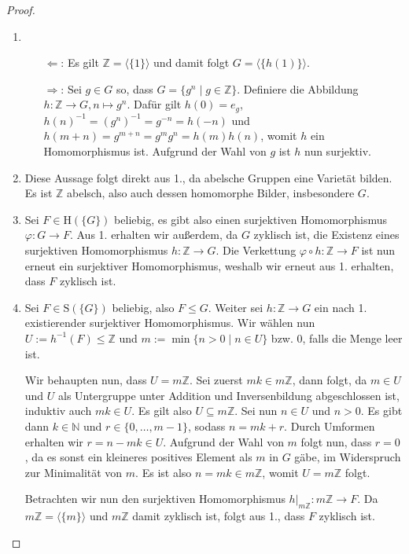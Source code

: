 \begin{proof} {\ }
    \begin{enumerate}
        \item \begin{itemize}
            \item[$\Leftarrow$:] Es gilt $\mathbb{Z}=\langle \{1\} \rangle$ und damit folgt $G=\langle \{h(1)\} \rangle$.
            \item[$\Rightarrow$:] Sei $g \in G$ so, dass $G = \{g^n \mid g \in \mathbb{Z}\} $. Definiere die Abbildung $h: \mathbb{Z} \to G, n \mapsto g^n$. Dafür gilt $h(0) = e_g$, $h(n)^{-1} = (g^{n})^{-1} = g^{-n} = h(-n)$ und $h(m+n) = g^{m+n} = g^m g^n = h(m)h(n)$, womit $h$ ein Homomorphismus ist. Aufgrund der Wahl von $g$ ist $h$ nun surjektiv.
        \end{itemize}
        \item Diese Aussage folgt direkt aus 1., da abelsche Gruppen eine Varietät bilden. Es ist $\mathbb{Z}$ abelsch, also auch dessen homomorphe Bilder, insbesondere $G$.
        \item Sei $F \in \mathrm{H}(\{G\})$ beliebig, es gibt also einen surjektiven Homomorphismus $\varphi: G \to F$. Aus 1. erhalten wir außerdem, da $G$ zyklisch ist, die Existenz eines surjektiven Homomorphismus $h: \mathbb{Z} \to G$. Die Verkettung $\varphi \circ h: \mathbb{Z} \to F$ ist nun erneut ein surjektiver Homomorphismus, weshalb wir erneut aus 1. erhalten, dass $F$ zyklisch ist.
        \item Sei $F \in \mathrm{S}(\{G\})$ beliebig, also $F \le G$. Weiter sei $h: \mathbb{Z} \to G$ ein nach 1. existierender surjektiver Homomorphismus.
        Wir wählen nun $U := h^{-1}(F) \le \mathbb{Z}$ und $m := \min\{n > 0 \mid n \in U\}$ bzw. $0$, falls die Menge leer ist. 
        
        Wir behaupten nun, dass $U = m \mathbb{Z}$. Sei zuerst $mk \in m\mathbb{Z}$, dann folgt, da $m \in U$ und $U$ als Untergruppe unter Addition und Inversenbildung abgeschlossen ist, induktiv auch $mk \in U$. Es gilt also $U \subseteq m\mathbb{Z}$. Sei nun $n \in U$ und \obda $n > 0$. Es gibt dann $k \in \mathbb{N}$ und $r \in \{0, \ldots, m-1\}$, sodass $n = mk+r$. Durch Umformen erhalten wir $r = n - mk \in U$. Aufgrund der Wahl von $m$ folgt nun, dass $r = 0$, da es sonst ein kleineres positives Element als $m$ in $G$ gäbe, im Widerspruch zur Minimalität von $m$. Es ist also $n = mk \in m\mathbb{Z}$, womit $U = m\mathbb{Z}$ folgt.

        Betrachten wir nun den surjektiven Homomorphismus $h\vert_{m\mathbb{Z}}: m\mathbb{Z} \to F$. Da $m\mathbb{Z} = \langle\{m\}\rangle$ und $m\mathbb{Z}$ damit zyklisch ist, folgt aus 1., dass $F$ zyklisch ist.
    \end{enumerate}
\end{proof}

